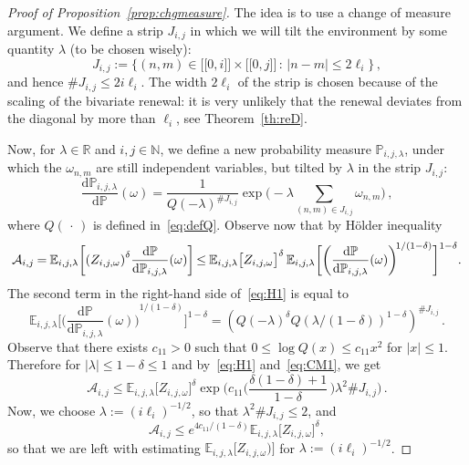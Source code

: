 \documentclass[10pt]{amsart}
\theoremstyle{definition}\newtheorem{defi}[theo]{Definition}\newtheorem{rema}[theo]{Remark}\newtheorem{exam}[theo]{Example}\newtheorem{exem}[theo]{Example}\newtheorem{nota}[theo]{Notation}
\newcommand{\llbracket}{\mathopen{[\![}}
\newcommand{\rrbracket}{\mathclose{]\!]}}
\newcommand{\gd}{\delta}
\newcommand{\dd}{\mathrm{d}}
\newcommand{\cA}{\ensuremath{\mathcal{A}}}
\newcommand{\bbE}{\ensuremath{\mathbb{E}}}
\newcommand{\bbN}{\ensuremath{\mathbb{N}}}
\newcommand{\bbP}{\ensuremath{\mathbb{P}}}
\newcommand{\bbR}{\ensuremath{\mathbb{R}}}
\newcommand*{\mk}{\mkern -1mu}
\newcommand*{\Mk}{\mkern -2mu}
\begin{document}
\begin{proof}[Proof of Proposition~\ref{prop:chgmeasure}]
The idea is to use a change of measure argument. We define a strip $J_{i,j}$ in which we will tilt the environment by some quantity $\lambda$ (to be chosen wisely):
\begin{equation}
J_{i,j} := \Big\{ (n,m) \in \llbracket 0, i \rrbracket \times \llbracket 0, j \rrbracket\,:\,|n-m| \leq 2 \ell_i \Big\}\,,
\end{equation}
and hence $\# J_{i,j} \leq 2 i \ell_i $. The width $2\ell_i$ of the strip is chosen because of the scaling of the bivariate renewal: it is very unlikely that the renewal deviates from the diagonal by more than $\ell_i$, see Theorem~\ref{th:reD}.

Now, for $\lambda\in\bbR$ and $i,j\in\bbN$, we define a new probability measure $\bbP_{i,j,\lambda}$, under which the $\omega_{n,m}$ are still independent variables, but tilted by $\lambda$ in the strip $J_{i,j}$:
\begin{equation}\label{eq:newmeasure}
\frac{\dd \bbP_{i,j,\lambda}}{\dd \bbP} (\omega) = \frac{1}{Q(-\lambda)^{ \# J_{i,j}}} \exp \Big(- \lambda \sum_{(n,m) \in J_{i,j}} \omega_{n,m} \Big)\,,
\end{equation}
where $Q({\,\cdot\,})$ is defined in~\eqref{eq:defQ}. Observe now that by Hölder inequality
\begin{equation}\label{eq:H1}
\!\!\cA_{i,j} \mk=\mk
\bbE_{i,j,\lambda} \biggl[{(Z_{i,j,\omega})}^\delta \frac{\dd\bbP}{\dd\bbP_{i,j,\lambda}} (\omega) \biggr] \Mk\le\mk \bbE_{i,j,\lambda}\big[Z_{i,j,\omega} \big]^{\gd}\,
\bbE_{i,j,\lambda} \bigg[{\bigg(\frac{\dd\bbP}{\dd\bbP_{i,j,\lambda}}(\omega) \bigg) }^{\!1/(1-\delta)} \bigg]^{1-\delta}.\!\!
\end{equation}
The second term in the right-hand side of~\eqref{eq:H1} is equal to
\begin{equation}\label{eq:CM1}
\bbE_{i,j,\lambda} \bigg[{\bigg(\frac{\dd\bbP}{\dd\bbP_{i,j,\lambda}}(\omega) \bigg)}^{1/(1-\delta)} \bigg]^{1-\delta} = {\left(Q(-\lambda)^{\delta} Q (\lambda /(1-\delta))^{1-\delta}\right)}^{\# J_{i,j}}\,.
\end{equation}
Observe that there exists $c_{11} >0$ such that $0 \le \log Q(x) \le c_{11} x^2$ for $\vert x \vert \le 1$. Therefore for $\vert \lambda \vert \le 1-\delta \leq 1$ and by~\eqref{eq:H1} and~\eqref{eq:CM1}, we get
\begin{equation}
\cA_{i,j}\le \bbE_{i,j,\lambda}\big[Z_{i,j,\omega} \big]^{\gd} \exp \biggl(c_{11} \biggl(\frac{\gd(1-\gd)+1}{1-\delta}\,\biggr) \lambda^2 \# J_{i,j} \biggr)\,.
\end{equation}
Now, we choose $\lambda:= (i\ell_i)^{-1/2}$, so that $\lambda^2 \# J_{i,j} \leq 2$, and
\begin{equation}\label{eq:afterHolder}
\cA_{i,j} \leq e^{4c_{11}/(1-\gd)} \bbE_{i,j,\lambda}\big[Z_{i,j,\omega} \big]^{\gd},
\end{equation}
so that we are left with estimating $\bbE_{i,j,\lambda}\big[Z_{i,j,\omega}) \big]$ for $\lambda:= (i\ell_i)^{-1/2}$.



\end{proof}
\end{document}
